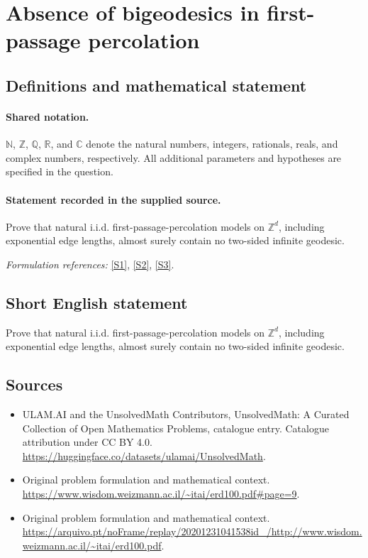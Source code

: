 \documentclass[11pt]{article}
\newcommand{\sref}[2]{\hyperlink{source:#1:#2}{[S#2]}}
\begin{document}
\section{Absence of bigeodesics in first-passage percolation}\label{statement}

\subsection{Definitions and mathematical statement}

\paragraph{Shared notation.}$\mathbb N$, $\mathbb Z$, $\mathbb Q$, $\mathbb R$, and $\mathbb C$ denote the natural numbers, integers, rationals, reals, and complex numbers, respectively. All additional parameters and hypotheses are specified in the question.


\paragraph{Statement recorded in the supplied source.}
Prove that natural i.i.d. first-passage-percolation models on $\mathbb{Z}^d$, including exponential edge lengths, almost surely contain no two-sided infinite geodesic.
\par\smallskip\textit{Formulation references:} \sref{statement}{1}, \sref{statement}{2}, \sref{statement}{3}.
\subsection{Short English statement}
Prove that natural i.i.d. first-passage-percolation models on $\mathbb{Z}^d$, including exponential edge lengths, almost surely contain no two-sided infinite geodesic.
\subsection{Sources}
\begin{itemize}
\item[\hypertarget{source:statement:1}{S1}] ULAM.AI and the UnsolvedMath Contributors, UnsolvedMath: A Curated Collection of Open Mathematics Problems, catalogue entry. Catalogue attribution under CC BY 4.0.
\url{https://huggingface.co/datasets/ulamai/UnsolvedMath}.
\item[\hypertarget{source:statement:2}{S2}] Original problem formulation and mathematical context.
\url{https://www.wisdom.weizmann.ac.il/~itai/erd100.pdf#page=9}.
\item[\hypertarget{source:statement:3}{S3}] Original problem formulation and mathematical context.
\url{https://arquivo.pt/noFrame/replay/20201231041538id_/http://www.wisdom.weizmann.ac.il/~itai/erd100.pdf}.
\end{itemize}
\label{end:statement}
\end{document}
